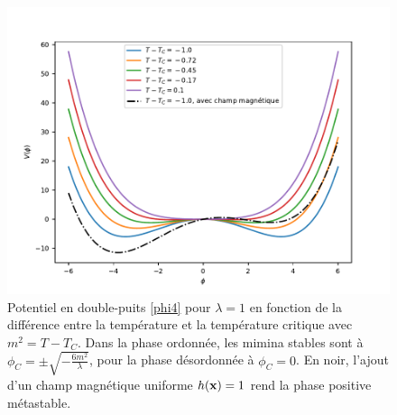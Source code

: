 \begin{figure}
    \centering
    \includegraphics[width=0.6\linewidth]{intro/double-puit-en-fonction-temp.pdf}
    \caption{Potentiel en double-puits \ref{phi4} pour $\lambda=1$ en fonction de la différence entre la température et la température critique avec $m^2 = T-T_C$. Dans la phase ordonnée, les mimina stables sont à $\phi_C =\pm \sqrt{- \frac{6 m^2}{\lambda} } $, pour la phase désordonnée à $\phi_C = 0$. En noir, l'ajout d'un champ magnétique uniforme $h({\bf x}) = 1$ rend la phase positive métastable.}
    \label{double-puits-temperature}
\end{figure}


